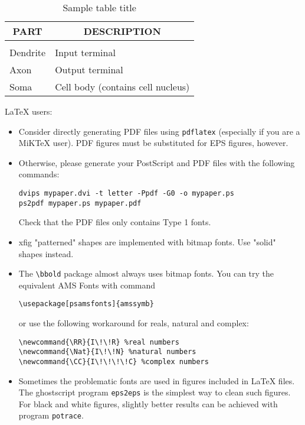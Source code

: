 \documentclass{article} %
\begin{document}
\begin{table}[t]
\caption{Sample table title}
\label{sample-table}
\begin{center}
\begin{tabular}{ll}
\multicolumn{1}{c}{\bf PART}  &\multicolumn{1}{c}{\bf DESCRIPTION}
\\ \hline \\
Dendrite         &Input terminal \\
Axon             &Output terminal \\
Soma             &Cell body (contains cell nucleus) \\
\end{tabular}
\end{center}
\end{table}

LaTeX users:

\begin{itemize}

\item Consider directly generating PDF files using \verb+pdflatex+
(especially if you are a MiKTeX user). 
PDF figures must be substituted for EPS figures, however.

\item Otherwise, please generate your PostScript and PDF files with the following commands:
\begin{verbatim} 
dvips mypaper.dvi -t letter -Ppdf -G0 -o mypaper.ps
ps2pdf mypaper.ps mypaper.pdf
\end{verbatim}

Check that the PDF files only contains Type 1 fonts. 

\item xfig "patterned" shapes are implemented with 
bitmap fonts.  Use "solid" shapes instead. 
\item The \verb+\bbold+ package almost always uses bitmap
fonts.  You can try the equivalent AMS Fonts with command
\begin{verbatim}
\usepackage[psamsfonts]{amssymb}
\end{verbatim}
 or use the following workaround for reals, natural and complex: 
\begin{verbatim}
\newcommand{\RR}{I\!\!R} %real numbers
\newcommand{\Nat}{I\!\!N} %natural numbers 
\newcommand{\CC}{I\!\!\!\!C} %complex numbers
\end{verbatim}

\item Sometimes the problematic fonts are used in figures
included in LaTeX files. The ghostscript program \verb+eps2eps+ is the simplest
way to clean such figures. For black and white figures, slightly better
results can be achieved with program \verb+potrace+.
\end{itemize}
\end{document}

